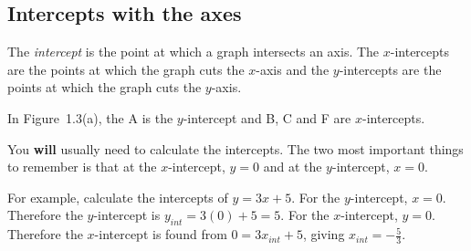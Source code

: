 \subsection*{ Intercepts with the axes}
\nopagebreak
\label{m39337*id236308}The \textsl{intercept} is the point at which a graph intersects an axis. The $x$-intercepts are the points at which the graph cuts the $x$-axis and the $y$-intercepts are the points at which the graph cuts the $y$-axis.\par 
\label{m39337*id236356}In Figure~1.3(a), the A is the $y$-intercept and B, C and F are $x$-intercepts.\par 
\label{m39337*id236384}You \textbf{will} usually need to calculate the intercepts. The two most important things to remember is that at the $x$-intercept, $y=0$ and at the $y$-intercept, $x=0$.\par 
\label{m39337*id236442}For example, calculate the intercepts of $y=3x+5$. For the $y$-intercept, $x=0$. Therefore the $y$-intercept is ${y}_{int}=3\left(0\right)+5=5$. For the $x$-intercept, $y=0$. Therefore the $x$-intercept is found from $0=3{x}_{int}+5$, giving ${x}_{int}=-\frac{5}{3}$.\par 
\label{m39337*uid47}
